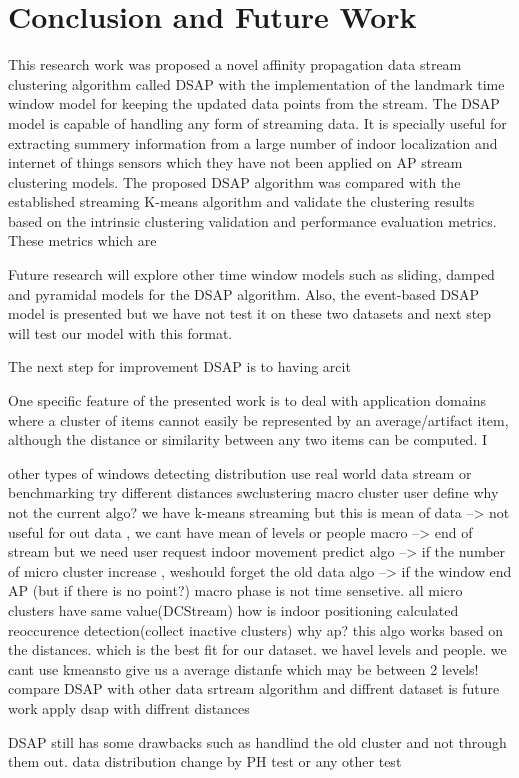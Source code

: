 \setlength{\parindent}{2em}

% 
\chapter{Conclusion and Future Work}

This research work was proposed a novel affinity propagation data stream clustering algorithm called DSAP with the implementation of the landmark time window model for keeping the updated data points from the stream. The DSAP model is capable of handling any form of streaming data. It is specially useful for extracting summery information from a large number of indoor localization and internet of things sensors which they have not been applied on AP stream clustering models.
The proposed DSAP algorithm was compared with the established streaming K-means algorithm and validate the clustering results based on the intrinsic clustering validation and performance evaluation metrics. These metrics which are 

Future research will explore other time window models such as sliding, damped and pyramidal models for the DSAP algorithm. Also, the event-based DSAP model is presented but we have not test it on these two datasets and next step will test our model with this format.

The next step for improvement DSAP is to having arcit


One specific feature of the presented work is to deal with application domains where a cluster of items cannot easily be represented by an average/artifact item, although the distance or similarity between any two items can be computed. I

other types of windows
detecting distribution
use real world data stream or benchmarking
try different distances 
swclustering
macro cluster user define
why not the current algo? we have k-means streaming but this is mean of data --> not useful for out data , we cant have mean of levels or people
macro --> end of stream but we need user request
indoor movement predict
algo --> if the number of micro cluster increase , weshould forget the old data
algo --> if the window end AP (but if there is no point?)
macro phase is not time sensetive. all micro clusters have same value(DCStream)
how is indoor positioning calculated
reoccurence detection(collect inactive clusters)
why ap? this algo works based on the distances. which is the best fit for our dataset. we havel levels and people. we cant use kmeansto give us a average distanfe which may be between 2 levels!
compare DSAP with other data srtream algorithm and diffrent dataset is future work
apply dsap with diffrent distances

DSAP still has some drawbacks such as handlind the old cluster and not through them out.
data distribution change by PH test or any other test
% 
